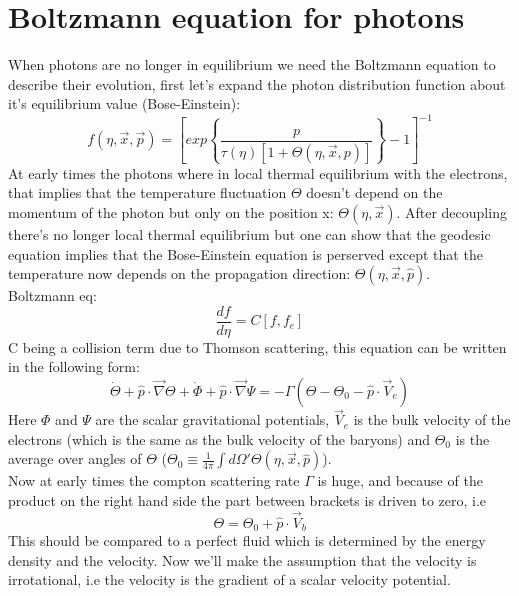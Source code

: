 \documentclass{article}
\begin{document}
 \section{Boltzmann equation for photons}
	When photons are no longer in equilibrium we need the Boltzmann equation to describe their evolution, first let's expand the photon distribution function about it's equilibrium value (Bose-Einstein):
	\begin{equation}
		f(\eta,\vec{x},\vec{p}) = \left[exp\left\{\frac{p}{\tau(\eta)[1+\Theta(\eta,\vec{x},p)]}\right\}-1\right]^{-1}
	\end{equation}
	At early times the photons where in local thermal equilibrium with the electrons, that implies that the temperature fluctuation $\Theta$ doesn't depend on the momentum of the photon but only on the position x: $\Theta(\eta,\vec{x})$.
	After decoupling there's no longer local thermal equilibrium but one can show that the geodesic equation implies that the Bose-Einstein equation is perserved except that the temperature now depends on the propagation direction: $\Theta(\eta,\vec{x},\hat{p}).$\\
	Boltzmann eq:
	\begin{equation}
	\frac{df}{d\eta} = C[f,f_e]
\end{equation}
C being a collision term due to Thomson scattering, this equation can be written in the following form:
\begin{equation}
	\dot{\Theta} + \hat{p}\cdot\vec{\nabla}\Theta + \dot{\Phi} + \hat{p}\cdot\vec{\nabla}\Psi = -\Gamma(\Theta-\Theta_0 - \hat{p}\cdot\vec{V}_e)
\end{equation}
Here $\Phi$ and $\Psi$ are the scalar gravitational potentials, $\vec{V}_e$ is the bulk velocity of the electrons (which is the same as the bulk velocity of the baryons) and $\Theta_0$ is the average over angles of $\Theta$ ($\Theta_0 \equiv \frac{1}{4\pi}\int d\Omega' \Theta(\eta,\vec{x},\hat{p})$).\\
Now at early times the compton scattering rate $\Gamma$ is huge, and because of the product on the right hand side the part between brackets is driven to zero, i.e 
\begin{equation}
	\Theta = \Theta_0 + \hat{p}\cdot\vec{V}_b \label{*}
\end{equation}
This should be compared to a perfect fluid which is determined by the energy density and the velocity. Now we'll make the assumption that the velocity is irrotational, i.e the velocity is the gradient of a scalar velocity potential.\\
\end{document}
